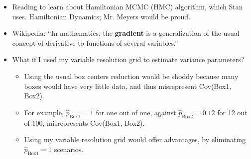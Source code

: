 \documentclass{article}
\begin{document}
\begin{itemize}
\item Reading \cite{Neal2011} to learn about Hamiltonian MCMC (HMC) algorithm, which Stan uses. Hamiltonian Dynamics; Mr. Meyers would be proud.
\item Wikipedia:  ``In mathematics, the {\bf gradient} is a generalization of the usual concept of derivative to functions of several variables.'' 
\item What if I used my variable resolution grid to estimate variance parameters? 
  \begin{itemize}
  \item Using the usual box centers reduction would be shoddy because many boxes would have very little data, and thus misrepresent Cov(Box1, Box2). 
  \item For example, $\hat{p}_{\text{Box1}} = 1$ for one out of one, against $\hat{p}_{\text{Box2}} = 0.12$ for 12 out of 100, misrepresents Cov(Box1, Box2). 
  \item Using my variable resolution grid would offer advantages, by eliminating $\hat{p}_{\text{Box1}} = 1$ scenarios.
  \end{itemize}
\end{itemize}
\end{document}

